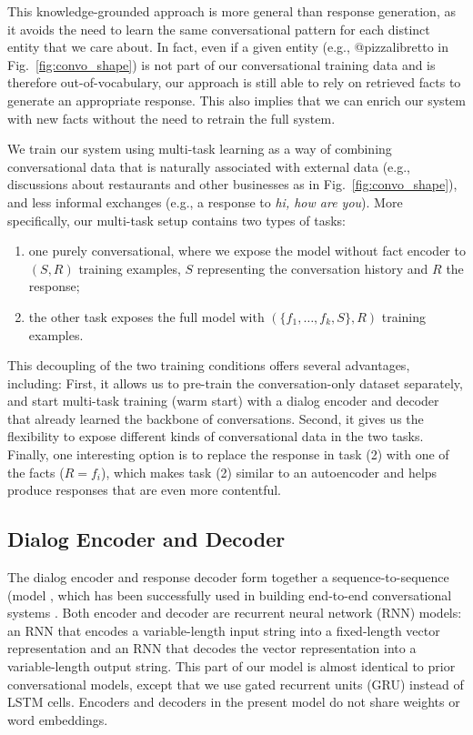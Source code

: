 \documentclass[letterpaper]{article}
\begin{document}
This knowledge-grounded approach is more general than \sts response generation, as it avoids the need to learn the same conversational pattern for each distinct entity that we care about. 
In fact, even if a given entity (e.g., @pizzalibretto in Fig.~\ref{fig:convo_shape}) 
is not part of our conversational training data and is therefore out-of-vocabulary, our approach is still able to rely on retrieved facts to generate an appropriate response.
This also implies that we can enrich our system with new facts without the need to retrain the full system.

We train our system using multi-task learning \cite{Caruana:1997,luong2015multi} as a way of combining conversational data that is naturally associated with external data (e.g., discussions about restaurants and other businesses as in Fig.~\ref{fig:convo_shape}), and less
informal
exchanges (e.g., a response to {\it hi, how are you}).
More specifically, our multi-task setup contains two types of tasks:
\begin{enumerate}[{(1)}]
\item one purely conversational, where we expose the model without fact encoder to $(S,R)$ training examples, $S$ representing the conversation history and $R$ the response;
\item the other task exposes the full model with $(\{f_1,\ldots,f_k,S\},R)$ training examples.
\end{enumerate}
This decoupling of the two training conditions offers several advantages, including:
First, it allows us to pre-train the conversation-only dataset separately, and start multi-task training (warm start) with a dialog encoder and decoder that already learned the backbone of conversations.
Second, it gives us the flexibility to expose different kinds of conversational data in the two tasks.
Finally, one interesting option is to replace the response in task (2) with one of the facts ($R=f_i$), which makes task (2) similar to an autoencoder and helps produce responses that are even more contentful.

\subsection{Dialog Encoder and Decoder}

The dialog encoder and response decoder form together a sequence-to-sequence (\sts model \cite{hochreiter1997long,sutskever2014sequence}, which has been successfully used in building end-to-end conversational systems \cite{sordoni2015,vinyals2015neural,li2016diversity}. Both encoder and decoder are recurrent neural network (RNN) models: an RNN that encodes a variable-length input string into a fixed-length vector representation and an RNN that decodes the vector representation into a variable-length output string. This part of our model is almost identical to prior conversational \sts models, except that we use gated recurrent units (GRU) \cite{gru:2014} instead of LSTM \cite{hochreiter1997long} cells. Encoders and decoders in  the present model do not share weights or word embeddings. 
\end{document}
